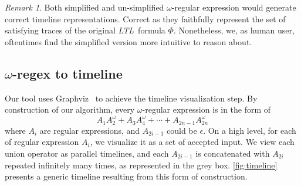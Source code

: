 \documentclass[preprint,12pt]{elsarticle}
\theoremstyle{definition}
\theoremstyle{remark}
\newtheorem{remark}{Remark}[section]
\newcommand{\ltl}{\textit{LTL}}
\begin{document}
\begin{remark}
    Both simplified and un-simplified $\omega$-regular expression would generate correct timeline representations. Correct as they faithfully represent the set of satisfying traces of the original \ltl\ formula $\Phi$. Nonetheless, we, as human user, oftentimes find the simplified version more intuitive to reason about.
\end{remark}

\subsection{$\omega$-regex to timeline} \label{regex2timeline}
Our tool uses Graphviz~\cite{Ellson2001GraphvizO} to achieve the timeline visualization step. By construction of our algorithm, every $\omega$-regular expression is in the form of
\[
    A_1A_2^{\omega} + A_3A_4^{\omega} + \cdots + A_{2n-1}A_{2n}^{\omega}
\]
where $A_i$ are regular expressions, and $A_{2i-1}$ could be $\epsilon$. On a high level, for each of regular expression $A_i$, we visualize it as a set of accepted input. We view each union operator as parallel timelines, and each $A_{2i-1}$ is concatenated with $A_{2i}$ repeated infinitely many times, as represented in the grey box. \cref{fig:timeline} presents a generic timeline resulting from this form of construction.
\end{document}
